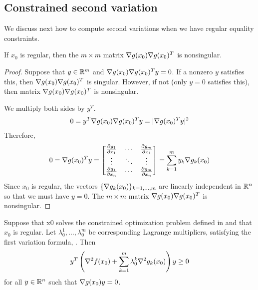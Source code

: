 \subsection{Constrained second variation}

We discuss next how to compute second variations when we have regular
equality constraints.

\begin{lemma}
If $x_0$ is regular, then the $m \times m$ matrix $\nabla g(x_0) \nabla g(x_0)^T$ is nonsingular.
\end{lemma}

\begin{proof}
Suppose that $y \in \mathbb{R}^m$ and $\nabla g(x_0) \nabla g(x_0)^T y = 0$.
If a nonzero $y$ satisfies this, then $\nabla g(x_0) \nabla g(x_0)^T$ is singular.
However, if not (only $y=0$ satisfies this), then matrix $\nabla g(x_0) \nabla g(x_0)^T$ is nonsingular.

We multiply both sides by $y^T$.
\begin{align}
0 = y^T \nabla g(x_0) \nabla g(x_0)^T y = |\nabla g(x_0)^T y|^2
\end{align}
Therefore,
\begin{align}
0 = \nabla g(x_0)^T y = 
\begin{bmatrix}
\frac{\partial g_1}{\partial x_1} & \cdots & \frac{\partial g_m}{\partial x_1} \\
\vdots & \ddots & \vdots \\
\frac{\partial g_1}{\partial x_n} & \cdots & \frac{\partial g_m}{\partial x_n} \\
\end{bmatrix}
= \sum _{k=1}^{m} y_k \nabla g_k(x_0)
\end{align}
Since $x_0$ is regular, the vectors $\{ \nabla g_k(x_0) \} _{k=1,\dots,m}$ are linearly independent in $\mathbb{R}^n$ so that we must have $y=0$.
The $m \times m$ matrix $\nabla g(x_0) \nabla g(x_0)^T$ is nonsingular.
\end{proof}

\begin{theorem}
Suppose that x0 solves the constrained optimization problem defined in  and that $x_0$ is regular.
Let $\lambda_0^1,\dots,\lambda_0^m$ be corresponding Lagrange multipliers, satisfying the first variation formula, .
Then
\begin{align}
y^T \left(\grad ^2 f(x_0) + \sum_{k=1}^{m}\lambda_0^k \grad ^2 g_k(x_0) \right) y \ge 0 \labeq{csvf}
\end{align}
for all $y \in \mathbb{R}^n$ such that $\nabla g(x_0) y = 0$.
\end{theorem}

